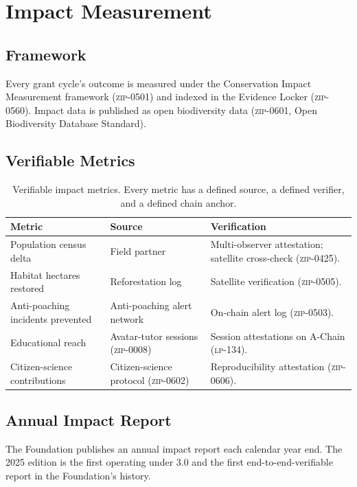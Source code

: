 \section{Impact Measurement}
\label{sec:impact}

\subsection{Framework}

Every grant cycle's outcome is measured under the Conservation Impact
Measurement framework (\textsc{zip-0501}) and indexed in the Evidence
Locker (\textsc{zip-0560}). Impact data is published as open
biodiversity data (\textsc{zip-0601}, Open Biodiversity Database
Standard).

\subsection{Verifiable Metrics}

\begin{table}[h]
\centering
\small
\begin{tabular}{p{5cm}p{4cm}p{5.5cm}}
\toprule
\textbf{Metric} & \textbf{Source} & \textbf{Verification} \\
\midrule
Population census delta & Field partner & Multi-observer attestation; satellite cross-check (\textsc{zip-0425}). \\
Habitat hectares restored & Reforestation log & Satellite verification (\textsc{zip-0505}). \\
Anti-poaching incidents prevented & Anti-poaching alert network & On-chain alert log (\textsc{zip-0503}). \\
Educational reach & Avatar-tutor sessions (\textsc{zip-0008}) & Session attestations on A-Chain (\textsc{lp-134}). \\
Citizen-science contributions & Citizen-science protocol (\textsc{zip-0602}) & Reproducibility attestation (\textsc{zip-0606}). \\
\bottomrule
\end{tabular}
\caption{Verifiable impact metrics. Every metric has a defined source,
a defined verifier, and a defined chain anchor.}
\end{table}

\subsection{Annual Impact Report}

The Foundation publishes an annual impact report each calendar year
end. The 2025 edition is the first operating under \Quasar{} 3.0 and
the first end-to-end-verifiable report in the Foundation's history.

